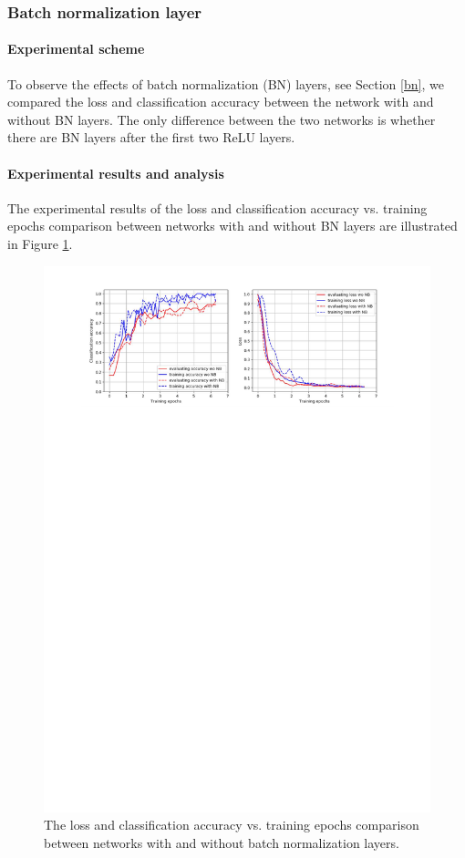 \subsubsection{Batch normalization layer}
\paragraph{Experimental scheme}
To observe the effects of batch normalization (BN) layers, see Section \ref{bn}, we compared the loss and classification accuracy between the network with and without BN layers. The only difference between the two networks is whether there are BN layers after the first two ReLU layers.  

\paragraph{Experimental results and analysis}
The experimental results of the loss and classification accuracy vs. training epochs comparison between networks with and without BN layers are illustrated in Figure \ref{fig:plot_bn_en}.
 \begin{figure}
	\includegraphics[trim=2.5cm 22.5cm 0cm 1cm]{fig01/plot_bn_en.pdf}
	\caption{The loss and classification accuracy vs. training epochs comparison between networks with and without batch normalization layers.}
	\label{fig:plot_bn_en}
\end{figure}

